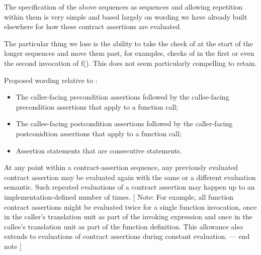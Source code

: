 The specification of the above sequences as sequences
and allowing repetition within them is very simple and based
largely on wording we have already built elsewhere for how
these contract assertions are evaluated.

The particular thing we lose is the ability to take
the check of  at the start of the longer
sequences and move them past, for examples, checks of
 in the first or even the second invocation of f().
This does not seem particularly compelling to retain.

Proposed wording relative to \cite{P2900R11}:

\begin{adjustwidth}{0.5cm}{0.5cm}
\begin{addedblock}
\begin{itemize}
\item The caller-facing precondition assertions followed by the callee-facing precondition assertions that apply to a function call;
\item The callee-facing postcondition assertions followed by the caller-facing postconidtion assertions that apply to a function call;
\item Assertion statements that are consecutive statements.
\end{itemize}
\end{addedblock}

At any point within a contract-assertion sequence, any previously evaluated contract assertion
may be evaluated again with the same or a different evaluation semantic. Such repeated
evaluations of a contract assertion may happen up to an implementation-defined number
of times. [ Note: For example, all function contract assertions might be evaluated twice for
a single function invocation, once in the caller’s translation unit as part of the invoking
expression and once in the callee’s translation unit as part of the function definition. This
allowance also extends to evaluations of contract assertions during constant evaluation.
— end note ]
\end{adjustwidth}




\renewcommand{\addcontentsline}[3]{}%







